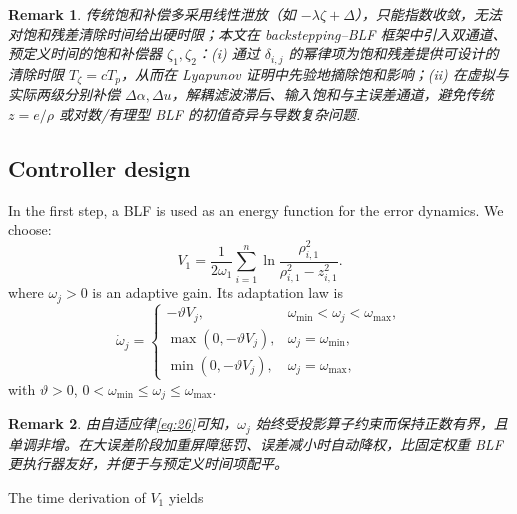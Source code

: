 \documentclass[pdflatex,sn-mathphys-num]{sn-jnl}%
\theoremstyle{thmstyleone}%
\theoremstyle{thmstyletwo}%
\newtheorem{remark}{Remark}%
\theoremstyle{thmstylethree}%
\begin{document}
\begin{remark}
	传统饱和补偿多采用线性泄放（如 $-\lambda\zeta+\Delta$），只能指数收敛，无法对饱和残差清除时间给出硬时限；本文在 backstepping–BLF 框架中引入双通道、预定义时间的饱和补偿器 $\zeta_{1},\zeta_{2}$：(i) 通过 $\delta_{i,j}$ 的幂律项为饱和残差提供可设计的清除时限 $T_{\zeta}=cT_p$，从而在 Lyapunov 证明中先验地摘除饱和影响；(ii) 在虚拟与实际两级分别补偿 $\Delta\alpha,\Delta u$，解耦滤波滞后、输入饱和与主误差通道，避免传统 $z=e/\rho$ 或对数/有理型 BLF 的初值奇异与导数复杂问题.
	\end{remark}

\subsection{Controller design}



In the first step, a BLF is used as an energy function for the error dynamics. We choose:
\begin{equation}\label{eq:25}
	V_1= \frac{1}{2 \omega_1}\sum_{i=1}^{n} \ln\frac{\rho_{i,1}^2}{\rho_{i,1}^2-z_{i,1}^2}. 
\end{equation}
where $ \omega_j>0$ is an adaptive gain. Its adaptation law is
\begin{equation}\label{eq:26}
\dot{\omega}_j=\begin{cases}
-\vartheta V_j,& \omega_{\min}<\omega_{j}<\omega_{\max},\\
\max(0,-\vartheta V_j),& \omega_{j}= \omega_{\min},\\
\min(0,-\vartheta V_j),& \omega_{j}= \omega_{\max},
\end{cases}
\end{equation}
with $\vartheta>0$, $ 0 < \omega_{\min} \le \omega_{j} \le \omega_{\max}$.

\begin{remark}
	由自适应律\cref{eq:26}可知，$\omega_{j}$ 始终受投影算子约束而保持正数有界，且单调非增。在大误差阶段加重屏障惩罚、误差减小时自动降权，比固定权重 BLF 更执行器友好，并便于与预定义时间项配平。
\end{remark}
The time derivation of $V_1$ yields 
\end{document}
